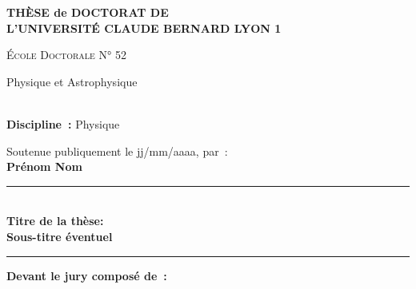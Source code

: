 \graphicspath{{resources/figures/frontmatter/}}

\begin{titlepage}

    \begin{center}
        \vspace*{-2cm}
        
        \vfill

        {\Large\bf THÈSE de DOCTORAT DE \\[2pt] L'UNIVERSITÉ CLAUDE BERNARD LYON 1}\\[12pt]
        {\Large \textsc{École Doctorale N° 52} \par Physique et Astrophysique}\\[10pt]
        {\Large \textbf{Discipline~:} Physique}

        \vfill

        {\large Soutenue publiquement le jj/mm/aaaa, par~:} \\[8pt]
        {\Large\bf Prénom Nom}

        \vspace{12pt}
        \rule{\textwidth}{1pt} \\[12pt]

        {\LARGE \bf Titre de la thèse: \\[5pt] 
        Sous-titre éventuel}

        \vspace{12pt}
        \rule{\textwidth}{1pt}

        \vfill

        {\large \bf Devant le jury composé de~:} \\[8pt]
        

\end{center}
\end{titlepage}
